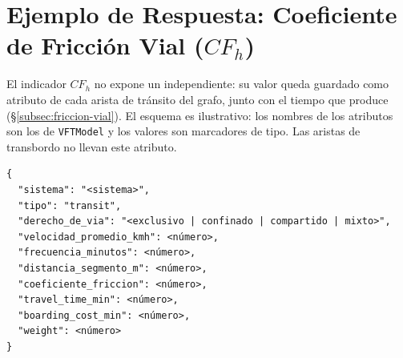 
\section{Ejemplo de Respuesta: Coeficiente de Fricción Vial \texorpdfstring{($CF_h$)}{(CFh)}}
\label{anx:vft-out-friccion}

El indicador $CF_h$ no expone un  independiente: su valor queda
guardado como atributo de cada arista de tránsito del grafo, junto con el
tiempo que produce (§\ref{subsec:friccion-vial}). El esquema es ilustrativo:
los nombres de los atributos son los de \texttt{VFTModel} y los valores son
marcadores de tipo. Las aristas de transbordo no llevan este atributo.

\begin{lstlisting}[style=estiloPython,
  caption={Atributos de una arista de tránsito que incluyen $CF_h$
           (ilustrativo).},
  label=lst:out-friccion]
{
  "sistema": "<sistema>",
  "tipo": "transit",
  "derecho_de_via": "<exclusivo | confinado | compartido | mixto>",
  "velocidad_promedio_kmh": <número>,
  "frecuencia_minutos": <número>,
  "distancia_segmento_m": <número>,
  "coeficiente_friccion": <número>,
  "travel_time_min": <número>,
  "boarding_cost_min": <número>,
  "weight": <número>
}
\end{lstlisting}
